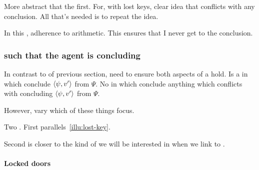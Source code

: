 \begin{note}
  More abstract that the first.
  For, with lost keys, clear idea that conflicts with any conclusion.
  All that's needed is to repeat the idea.

  In this , adherence to arithmetic.
  This ensures that I never get to the conclusion.
\end{note}

\subsubsection{ such that the agent is concluding}

\begin{note}
  In contrast to  of previous section, need to ensure both aspects of a  hold.
  Is a  \pevent{} in which conclude \(\langle \psi, v' \rangle\) from \(\Psi\).
  No \pevent{} in which conclude anything which conflicts with concluding \(\langle \psi, v' \rangle\) from \(\Psi\).

  However, vary which of these things focus.
\end{note}

\begin{note}
  Two .
  First parallels~\autoref{illu:lost-key}.

  Second is closer to the kind of  we will be interested in when we link  to \issueConstraint{}.
\end{note}

\paragraph{Locked doors}

